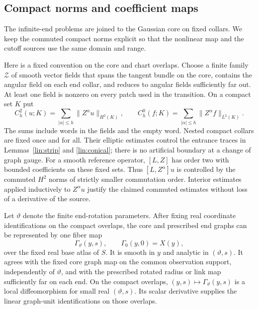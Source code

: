 \subsection{Compact norms and coefficient maps}

The infinite-end problems are joined to the Gaussian core on fixed
collars.  We keep the commuted compact norms explicit so that the
nonlinear map and the cutoff sources use the same domain and range.

Here is a fixed convention on the core and chart overlaps.  Choose a
finite family $\mathcal Z$ of smooth vector fields that spans the
tangent bundle on the core, contains the angular field on each end
collar, and reduces to angular fields sufficiently far out.  At least
one field is nonzero on every patch used in the transition.  On a
compact set $K$ put
\begin{equation}\label{lin:compact-norm}
 C_h^2(u;K)=\sum_{|\alpha|\le h}\|Z^\alpha u\|_{H^2(K)},
 \qquad C_h^0(f;K)=\sum_{|\alpha|\le h}\|Z^\alpha f\|_{L^2(K)}.
\end{equation}
The sums include words in the fields and the empty word.  Nested
compact collars are fixed once and for all.  Their elliptic estimates
control the entrance traces in Lemmas~\ref{lin:strip} and
\ref{lin:conical}; there is no artificial boundary at a change of
graph gauge.
For a smooth reference operator, $[L,Z]$ has order two with bounded
coefficients on these fixed sets.  Thus $[L,Z^\alpha]u$ is controlled
by the commuted $H^2$ norms of strictly smaller commutation order.
Interior estimates applied inductively to $Z^\alpha u$ justify the
claimed commuted estimates without loss of a derivative of the source.

\begin{lemma}\label{gauge:fiber-atlas}
Let $\vartheta$ denote the finite end-rotation parameters.  After fixing
real coordinate identifications on the compact overlaps, the core and
prescribed end graphs can be represented by one fiber map
\[
 \Gamma_\vartheta(y,s),\qquad \Gamma_0(y,0)=X(y),
\]
over the fixed real base atlas of $S$.  It is smooth in $y$ and analytic
in $(\vartheta,s)$.  It agrees with the fixed core graph map on the common
observation support, independently of $\vartheta$, and with the prescribed
rotated radius or link map sufficiently far on each end.  On the compact
overlaps, $(y,s)\mapsto\Gamma_\vartheta(y,s)$ is a local diffeomorphism
for small real $(\vartheta,s)$.  Its scalar derivative supplies the
linear graph-unit identifications on those overlaps.
\end{lemma}

